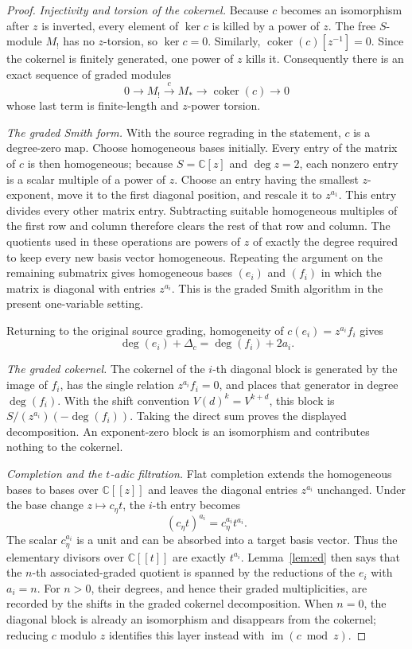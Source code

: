\documentclass[11pt]{amsart}
\theoremstyle{definition}
\theoremstyle{remark}
\newcommand{\C}{\mathbb C}
\newcommand{\A}{\C[[t]]}
\begin{document}
\begin{proof}
\smallskip
\noindent\emph{Injectivity and torsion of the cokernel.}
Because $c$ becomes an isomorphism after $z$ is inverted, every element of
$\ker c$ is killed by a power of $z$.  The free $S$-module $M_!$ has no
$z$-torsion, so $\ker c=0$.  Similarly,
$\operatorname{coker}(c)[z^{-1}]=0$.  Since the cokernel is finitely
generated, one power of $z$ kills it.  Consequently there is an exact sequence of
graded modules
\[
 0\longrightarrow M_!\xrightarrow{c}M_*
 \longrightarrow\operatorname{coker}(c)\longrightarrow0
\]
whose last term is finite-length and $z$-power torsion.

\smallskip
\noindent\emph{The graded Smith form.}
With the source regrading in the statement, $c$ is a degree-zero map.  Choose
homogeneous bases initially.  Every entry of the matrix of $c$ is then
homogeneous; because $S=\mathbb C[z]$ and $\deg z=2$, each nonzero entry is a
scalar multiple of a power of $z$.  Choose an entry having the smallest
$z$-exponent, move it to the first diagonal position, and rescale it to
$z^{a_1}$.  This entry divides every other matrix entry.  Subtracting suitable
homogeneous multiples of the first row and column therefore clears the rest
of that row and column.  The quotients used in these operations are powers of
$z$ of exactly the degree required to keep every new basis vector
homogeneous.  Repeating the argument on the remaining submatrix gives
homogeneous bases $(e_i)$ and $(f_i)$ in which the matrix is diagonal with
entries $z^{a_i}$.  This is the graded Smith algorithm in the present
one-variable setting.

Returning to the original source grading, homogeneity of
$c(e_i)=z^{a_i}f_i$ gives
\[
 \deg(e_i)+\Delta_c=\deg(f_i)+2a_i.
\]

\smallskip
\noindent\emph{The graded cokernel.}
The cokernel of the $i$-th diagonal block is generated by the image of
$f_i$, has the single relation $z^{a_i}f_i=0$, and places that generator in
degree $\deg(f_i)$.  With the shift convention
$V(d)^k=V^{k+d}$, this block is
$S/(z^{a_i})(-\deg(f_i))$.  Taking the direct sum proves the displayed
decomposition.  An exponent-zero block is an isomorphism and
contributes nothing to the cokernel.

\smallskip
\noindent\emph{Completion and the $t$-adic filtration.}
Flat completion extends the homogeneous bases to bases over
$\mathbb C[[z]]$ and leaves the diagonal entries $z^{a_i}$ unchanged.  Under
the base change $z\mapsto c_\eta t$, the $i$-th entry becomes
\[
 (c_\eta t)^{a_i}=c_\eta^{a_i}t^{a_i}.
\]
The scalar $c_\eta^{a_i}$ is a unit and can be absorbed into a target basis
vector.  Thus the elementary divisors over $\A$ are exactly $t^{a_i}$.
Lemma~\ref{lem:ed} then says that the $n$-th associated-graded quotient is
spanned by the reductions of the $e_i$ with $a_i=n$.  For $n>0$, their
degrees, and hence their graded multiplicities, are recorded by the shifts in
the graded cokernel decomposition.  When $n=0$, the diagonal block is already
an isomorphism and disappears from the cokernel; reducing $c$ modulo $z$
identifies this layer instead with $\operatorname{im}(c\bmod z)$.
\end{proof}
\end{document}
